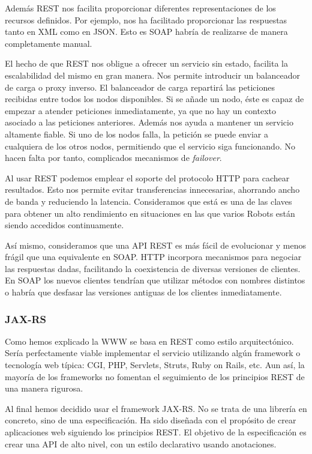 Además REST nos facilita proporcionar diferentes representaciones de
los recursos definidos. Por ejemplo, nos ha facilitado proporcionar
las respuestas tanto en XML como en JSON. Esto es SOAP habría de
realizarse de manera completamente manual.

El hecho de que REST nos obligue a ofrecer un servicio sin estado,
facilita la escalabilidad del mismo en gran manera. Nos permite
introducir un balanceador de carga o proxy inverso. El balanceador de
carga repartirá las peticiones recibidas entre todos los nodos
disponibles. Si se añade un nodo, éste es capaz de empezar a atender
peticiones inmediatamente, ya que no hay un contexto asociado a las
peticiones anteriores. Además nos ayuda a mantener un servicio
altamente fiable. Si uno de los nodos falla, la petición se puede
enviar a cualquiera de los otros nodos, permitiendo que el servicio
siga funcionando. No hacen falta por tanto, complicados mecanismos de
\emph{failover}.

Al usar REST podemos emplear el soporte del protocolo HTTP para
cachear resultados. Esto nos permite evitar transferencias
innecesarias, ahorrando ancho de banda y reduciendo la
latencia. Consideramos que está es una de las claves para obtener un
alto rendimiento en situaciones en las que varios Robots están siendo
accedidos continuamente.

Así mismo, consideramos que una API REST es más fácil de evolucionar y
menos frágil que una equivalente en SOAP. HTTP incorpora mecanismos
para negociar las respuestas dadas, facilitando la coexistencia de
diversas versiones de clientes. En SOAP los nuevos clientes tendrían
que utilizar métodos con nombres distintos o habría que desfasar las
versiones antiguas de los clientes inmediatamente.


\subsubsection{JAX-RS\cite{JAXRS}}

Como hemos explicado la WWW se basa en REST como estilo
arquitectónico. Sería perfectamente viable implementar el servicio
utilizando algún framework o tecnología web típica: CGI, PHP,
Servlets, Struts, Ruby on Rails, etc. Aun así, la mayoría de los
frameworks no fomentan el seguimiento de los principios REST de una
manera rigurosa.

Al final hemos decidido usar el framework JAX-RS. No se trata de una
librería en concreto, sino de una especificación. Ha sido diseñada con
el propósito de crear aplicaciones web siguiendo los principios
REST. El objetivo de la especificación es crear una API de alto nivel,
con un estilo declarativo usando anotaciones.

